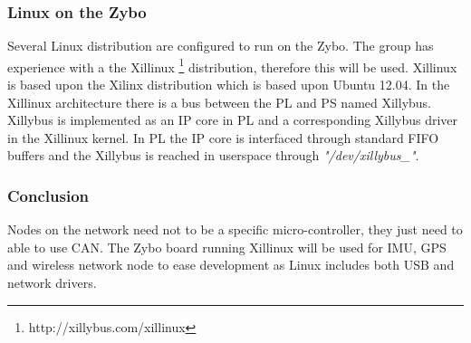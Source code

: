 \subsubsection*{Linux on the Zybo}
Several Linux distribution are configured to run on the Zybo. 
The group has experience with a the Xillinux \footnote{http://xillybus.com/xillinux} distribution, therefore this will be used.
Xillinux is based upon the Xilinx distribution which is based upon Ubuntu 12.04.
In the Xillinux architecture there is a bus between the PL and PS named Xillybus.
Xillybus is implemented as an IP core in PL and a corresponding Xillybus driver in the Xillinux kernel.
In PL the IP core is interfaced through standard FIFO buffers and the Xillybus is reached in userspace through \textit{"/dev/xillybus\_"}.

\subsubsection*{Conclusion}
Nodes on the network need not to be a specific micro-controller, they just need to able to use CAN.
The Zybo board running Xillinux will be used for IMU, GPS and wireless network node to ease development as Linux includes both USB and network drivers. 